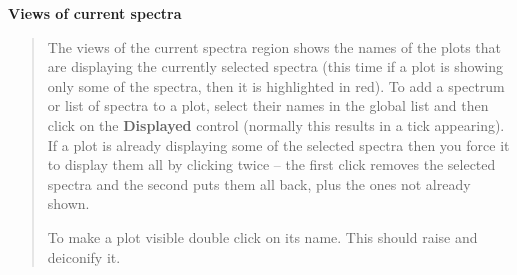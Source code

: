 \documentclass[twoside,11pt]{article}
\renewcommand{\_}{\texttt{\symbol{95}}}
\newcommand{\labelitem}[1]{\textbf{#1}}
\newcommand{\subheading}[1]{\textbf{\large{#1}}}
\begin{document}
\subheading{Views of current spectra}
\begin{quote}
 The views of the current spectra region shows the names of the plots that are
 displaying the currently selected spectra (this time if a plot is showing
 only some of the spectra, then it is highlighted in red). To add a spectrum
 or list of spectra to a plot, select their names in the global list and then
 click on the \labelitem{Displayed} control (normally this results in a tick
 appearing). If a plot is already displaying some of the selected spectra then
 you force it to display them all by clicking twice -- the first click removes
 the selected spectra and the second puts them all back, plus the ones not
 already shown.

 To make a plot visible double click on its name. This should raise and
 deiconify it.
\end{quote}
\end{document}
